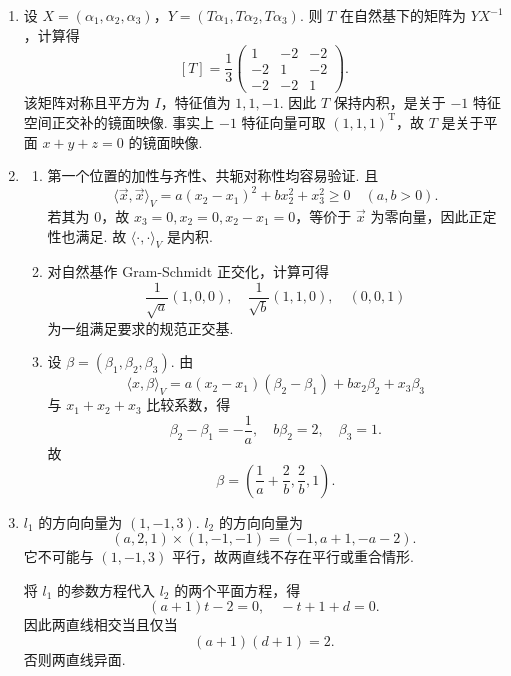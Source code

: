 \begin{enumerate}
    若 $B^2=A$，则 $B$ 也是幂零矩阵. $4$ 阶幂零矩阵的 Jordan 块平方后，非零块大小只能由原块大小决定：$J_4(0)^2$ 的 Jordan 型为 $J_2(0)\oplus J_2(0)$，$J_3(0)^2$ 的 Jordan 型为 $J_2(0)\oplus J_1(0)$，更小块也不可能产生 $J_3(0)$. 因此 $B^2$ 不可能有 $J_3(0)$ 块，矛盾. 故不存在复矩阵 $B$ 使 $B^2=A$.

    当然也有更简单的办法：若 $B^2=A$，则 $B^6=A^3=O$，说明 $B$ 也是 $4$ 阶幂零矩阵，故 $B^4=A^2=O$，与 $A^2\neq O$ 矛盾.

    \item 设 $X=(\alpha_1,\alpha_2,\alpha_3)$，$Y=(T\alpha_1,T\alpha_2,T\alpha_3)$. 则 $T$ 在自然基下的矩阵为 $YX^{-1}$，计算得
    \[
        [T]=\frac13
        \begin{pmatrix}
            1&-2&-2\\
            -2&1&-2\\
            -2&-2&1
        \end{pmatrix}.
    \]
    该矩阵对称且平方为 $I$，特征值为 $1,1,-1$. 因此 $T$ 保持内积，是关于 $-1$ 特征空间正交补的镜面映像. 事实上 $-1$ 特征向量可取 $(1,1,1)^{\mathrm{T}}$，故 $T$ 是关于平面 $x+y+z=0$ 的镜面映像.

    \item
    \begin{enumerate}
        \item 第一个位置的加性与齐性、共轭对称性均容易验证. 且
        \[
            \langle \vec{x}, \vec{x}\rangle_V=a(x_2-x_1)^2+bx_2^2+x_3^2 \geqslant 0 \quad(a,b>0).
        \]
        若其为 $0$，故 $x_3=0,x_2=0,x_2-x_1=0$，等价于 $\vec{x}$ 为零向量，因此正定性也满足. 故 $\langle \cdot, \cdot \rangle_V$ 是内积.

        \item 对自然基作 Gram-Schmidt 正交化，计算可得
        \[
            \frac{1}{\sqrt a}(1,0,0),\quad
            \frac{1}{\sqrt b}(1,1,0),\quad
            (0,0,1)
        \]
        为一组满足要求的规范正交基.

        \item 设 $\beta=(\beta_1,\beta_2,\beta_3)$. 由
        \[
            \langle x,\beta\rangle_V
            =a(x_2-x_1)(\beta_2-\beta_1)+bx_2\beta_2+x_3\beta_3
        \]
        与 $x_1+x_2+x_3$ 比较系数，得
        \[
            \beta_2-\beta_1=-\frac1a,\quad b\beta_2=2,\quad \beta_3=1.
        \]
        故
        \[
            \beta=\left(\frac1a+\frac2b,\frac2b,1\right).
        \]
    \end{enumerate}

    \item $l_1$ 的方向向量为 $(1,-1,3)$. $l_2$ 的方向向量为
    \[
        (a,2,1)\times(1,-1,-1)=(-1,a+1,-a-2).
    \]
    它不可能与 $(1,-1,3)$ 平行，故两直线不存在平行或重合情形.

    将 $l_1$ 的参数方程代入 $l_2$ 的两个平面方程，得
    \[
        (a+1)t-2=0,\quad -t+1+d=0.
    \]
    因此两直线相交当且仅当
    \[
        (a+1)(d+1)=2.
    \]
    否则两直线异面.
\end{enumerate}

\clearpage
